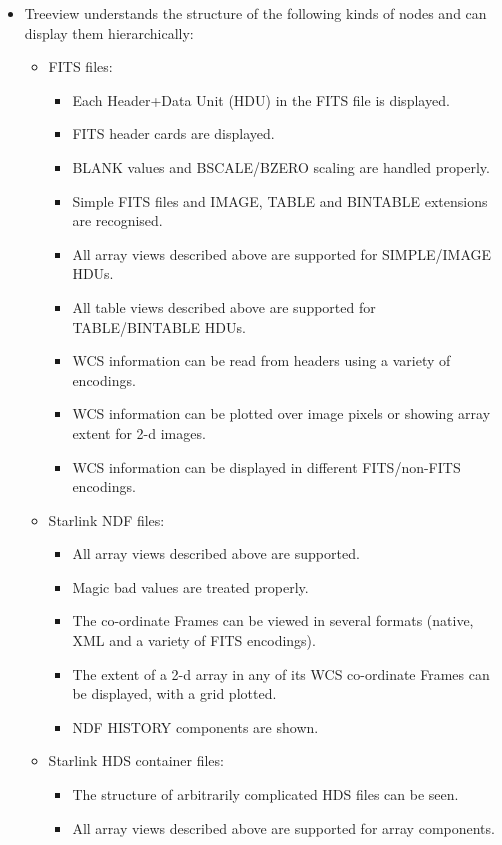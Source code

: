 \documentclass[twoside,11pt]{article}
\renewcommand{\_}{\texttt{\symbol{95}}}
\begin{document}
\begin{itemize}
\item Treeview understands the structure of the following kinds of nodes and can display 
      them hierarchically:

\begin{itemize}

\item FITS files:

\begin{itemize}
 \item Each Header+Data Unit (HDU) in the FITS file is displayed.
 \item FITS header cards are displayed.
 \item BLANK values and BSCALE/BZERO scaling are handled properly.
 \item Simple FITS files and IMAGE, TABLE and BINTABLE extensions are
       recognised.
 \item All array views described above are supported for SIMPLE/IMAGE HDUs.
 \item All table views described above are supported for TABLE/BINTABLE HDUs.
 \item WCS information can be read from headers using a variety of encodings.
 \item WCS information can be plotted over image pixels or showing array extent
       for 2-d images.
 \item WCS information can be displayed in different FITS/non-FITS encodings. 
\end{itemize}

\item Starlink NDF files:

\begin{itemize}
 \item All array views described above are supported.
 \item Magic bad values are treated properly.
 \item The co-ordinate Frames can be viewed in several formats (native, XML and a 
       variety of FITS encodings).
 \item The extent of a 2-d array in any of its WCS co-ordinate Frames can be displayed, 
       with a grid plotted.
 \item NDF HISTORY components are shown. 
\end{itemize}

\item Starlink HDS container files:
\begin{itemize}
 \item The structure of arbitrarily complicated HDS files can be seen.
 \item All array views described above are supported for array components. 
\end{itemize}


\end{itemize}
\end{itemize}
\end{document}
